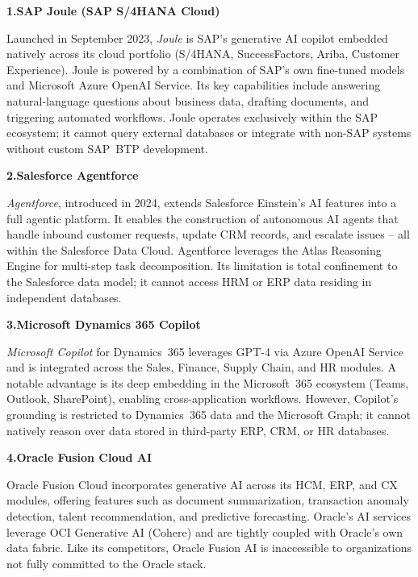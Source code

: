 \documentclass[12pt,a4paper]{report}
\newcommand{\sys}[1]{\textit{\color{talanblue}#1}}
\begin{document}
\medskip
\noindent\textbf{\color{talannavy}1.\quad SAP Joule (SAP S/4HANA Cloud)}

\smallskip\noindent
Launched in September 2023, \sys{Joule} is SAP's generative AI copilot embedded natively across
its cloud portfolio (S/4HANA, SuccessFactors, Ariba, Customer Experience).
Joule is powered by a combination of SAP's own fine-tuned models and Microsoft Azure OpenAI Service.
Its key capabilities include answering natural-language questions about business data, drafting
documents, and triggering automated workflows.
Joule operates exclusively within the SAP ecosystem; it cannot query external databases or integrate
with non-SAP systems without custom SAP~BTP development.

\medskip
\noindent\textbf{\color{talannavy}2.\quad Salesforce Agentforce}

\smallskip\noindent
\sys{Agentforce}, introduced in 2024, extends Salesforce Einstein's AI features into a full agentic
platform.
It enables the construction of autonomous AI agents that handle inbound customer requests, update
CRM records, and escalate issues -- all within the Salesforce Data Cloud.
Agentforce leverages the Atlas Reasoning Engine for multi-step task decomposition.
Its limitation is total confinement to the Salesforce data model; it cannot access HRM or ERP data
residing in independent databases.

\medskip
\noindent\textbf{\color{talannavy}3.\quad Microsoft Dynamics 365 Copilot}

\smallskip\noindent
\sys{Microsoft Copilot} for Dynamics~365 leverages GPT-4 via Azure OpenAI Service and is integrated
across the Sales, Finance, Supply Chain, and HR modules.
A notable advantage is its deep embedding in the Microsoft~365 ecosystem (Teams, Outlook,
SharePoint), enabling cross-application workflows.
However, Copilot's grounding is restricted to Dynamics~365 data and the Microsoft Graph; it cannot
natively reason over data stored in third-party ERP, CRM, or HR databases.

\medskip
\noindent\textbf{\color{talannavy}4.\quad Oracle Fusion Cloud AI}

\smallskip\noindent
Oracle Fusion Cloud incorporates generative AI across its HCM, ERP, and CX modules, offering
features such as document summarization, transaction anomaly detection, talent recommendation, and
predictive forecasting.
Oracle's AI services leverage OCI Generative AI (Cohere) and are tightly coupled with Oracle's own
data fabric.
Like its competitors, Oracle Fusion AI is inaccessible to organizations not fully committed to the
Oracle stack.
\end{document}
